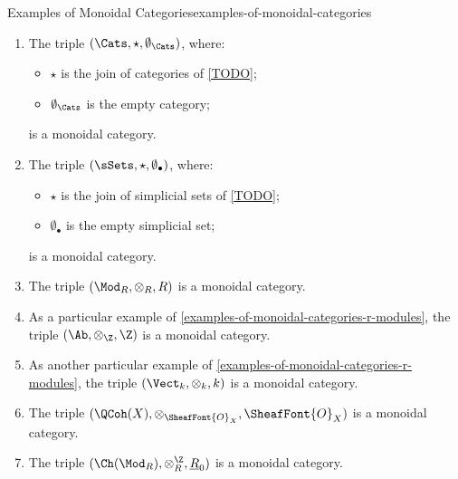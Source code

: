 \begin{example}{Examples of Monoidal Categories}{examples-of-monoidal-categories}
\begin{enumerate}
\begin{itemize}
                \item $\Grpd$     (\cref{TODO}).
                \item $\Sch_{/S}$ (\cref{TODO}).
            \end{itemize}
        \item\label{examples-of-monoidal-categories-categories-and-joins}The triple $(\Cats,\star,\emptyset_{\Cats})$, where:
            \begin{itemize}
                \item $\star$ is the join of categories of \cref{TODO};
                \item $\emptyset_{\Cats}$ is the empty category;
            \end{itemize}
            is a monoidal category.
        \item\label{examples-of-monoidal-categories-simplicial-sets}The triple $(\sSets,\star,\emptyset_{\bullet})$, where:
            \begin{itemize}
                \item $\star$ is the join of simplicial sets of \cref{TODO};
                \item $\emptyset_{\bullet}$ is the empty simplicial set;
            \end{itemize}
            is a monoidal category.
        \item\label{examples-of-monoidal-categories-r-modules}The triple $(\Mod_{R},\otimes_{R},R)$ is a monoidal category.
        \item\label{examples-of-monoidal-categories-abelian-groups}As a particular example of \cref{examples-of-monoidal-categories-r-modules}, the triple $(\Ab,\otimes_{\Z},\Z)$ is a monoidal category.
        \item\label{examples-of-monoidal-categories-vector-spaces}As another particular example of \cref{examples-of-monoidal-categories-r-modules}, the triple $(\Vect_{k},\otimes_{k},k)$ is a monoidal category.
        \item\label{examples-of-monoidal-categories-quasicoherent-sheaves}The triple $(\QCoh(X),\otimes_{\SheafFont{O}_{X}},\SheafFont{O}_{X})$ is a monoidal category.
        \item\label{examples-of-monoidal-categories-chain-complexes}The triple $(\Ch(\Mod_{R}),\otimes^{\Z}_{R},\underline{R}_{0})$ is a monoidal category.
    \end{enumerate}
\end{example}
